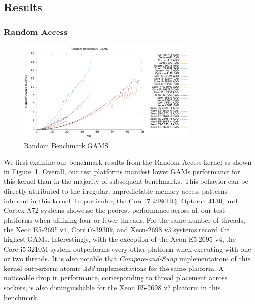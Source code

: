 
\subsection{Results}
\label{subsec:results}

\subsubsection{Random Access}
\label{subsubsec:random_access_res}

\begin{figure}[!t]
\centering
\includegraphics[width=3.5in]{figures/RAND_GAMS.png}
\caption{Random Benchmark GAMS}
\label{fig:rand_gams}
\end{figure}

We first examine our benchmark results from the Random Access kernel as shown in Figure~\ref{fig:rand_gams}.
Overall, our test platforms manifest lower GAMs performance for this kernel than in the majority of subsequent benchmarks.
This behavior can be directly attributed to the irregular, unpredictable memory access patterns inherent in this kernel.
In particular, the Core i7-4980HQ, Opteron 4130, and Cortex-A72 systems showcase the poorest performance across all our test platforms when utilizing four or fewer threads.
For the same number of threads, the Xeon E5-2695 v4, Core i7-3930k, and Xeon-2698 v3 systems record the highest GAMs.
Interestingly, with the exception of the Xeon E5-2695 v4, the Core i5-3210M system outperforms every other platform when executing with one or two threads.
It is also notable that \textit{Compare-and-Swap} implementations of this kernel outperform atomic \textit{Add} implementations for the same platform.
A noticeable drop in performance, corresponding to thread placement across sockets, is also distinguishable for the Xeon E5-2698 v3 platform in this benchmark. 

